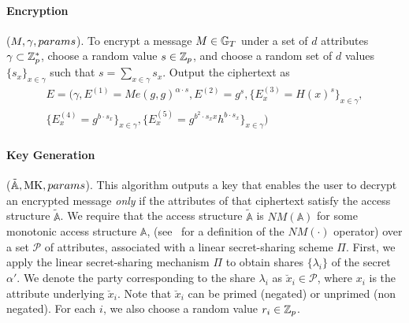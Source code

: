 %

\paragraph{Encryption} ($M,\gamma,params$).
To encrypt a
message $M \in \mathbb{G}_T$ under a set of $d$ attributes $\gamma \subset \mathbb{Z}_p^*$,
choose a random value $s\in\mathbb{Z}_p$, and choose a random set of $d$ values $\{s_x\}_{x \in \gamma}$
such that $s= \sum_{x \in \gamma} s_x$. Output the ciphertext
as
\begin{eqnarray*}
E = (
\gamma, E^{(1)} = M e(g, g)^{\alpha \cdot s},
E^{(2)} = g^s,
\{E^{(3)}_x = H(x)^s\}_{x\in\gamma}, \\
\{E^{(4)}_x = g^{b\cdot s_x}\}_{x\in\gamma},
\{E^{(5)}_x = g^{b^2\cdot s_x x} h^{b \cdot s_x}\}_{x\in\gamma}
)
\end{eqnarray*}

\paragraph{Key Generation} ($\mathbb{\tilde{A}},\textrm{MK},params$).
This
algorithm outputs a key that enables the user to decrypt an encrypted message \emph{only}
 if the attributes of that ciphertext
satisfy the access structure $\mathbb{\tilde{A}}$.  We require that the
access structure $\mathbb{\tilde{A}}$ is $NM(\mathbb{A})$ for some monotonic access structure $\mathbb{A}$, (see~\cite{OSW07} for a definition of the $NM(\cdot)$ operator)
over a set $\mathcal{P}$ of attributes, associated with a linear secret-sharing scheme $\Pi$.
First, we apply the linear secret-sharing mechanism $\Pi$ to obtain shares $\{\lambda_i\}$ of the
secret $\alpha'$.  We denote the
party corresponding to the share $\lambda_i$ as $\breve{x}_i \in \mathcal{P}$,
where $x_i$
is the attribute underlying $\breve{x}_i$.  Note that $\breve{x}_i$
can be primed (negated) or unprimed (non negated).
For each $i$, we also choose a random value $r_i\in\mathbb{Z}_p$.

